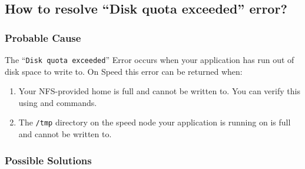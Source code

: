 \subsection{How to resolve ``Disk quota exceeded'' error?}

\subsubsection{Probable Cause}
The ``\texttt{Disk quota exceeded}'' Error occurs when your application has 
run out of disk space to write to. On Speed this error can be returned when:
 
\begin{enumerate}
	\item Your NFS-provided home is full and cannot be written to.
	You can verify this using  and  commands.
	\item The \texttt{/tmp} directory on the speed node your application is running on is full and cannot be written to.
\end{enumerate}

\subsubsection{Possible Solutions}

